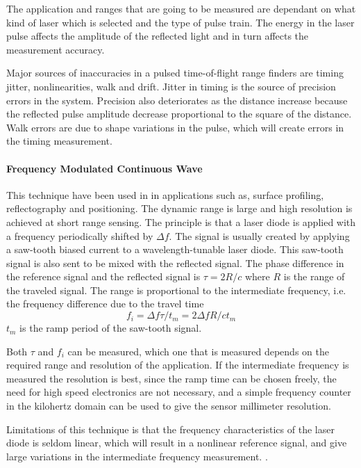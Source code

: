 The application and ranges that are going to be measured are dependant on what kind of
laser which is selected and the type of pulse train. The energy in the laser pulse affects the amplitude of the
reflected light and in turn affects the measurement accuracy.

Major sources of inaccuracies in a pulsed time-of-flight range finders are timing jitter,
nonlinearities, walk and drift. Jitter in timing is the source of precision errors in the
system. Precision also deteriorates as the distance increase because the reflected pulse
amplitude decrease proportional to the square of the distance\cite{pulsed-tof}.
Walk errors are due to shape variations in the pulse, which will create errors in the
timing measurement. 





\paragraph{Frequency Modulated Continuous Wave}
This technique have been used in in applications such as, surface profiling, 
reflectography and positioning. The dynamic range is large and
high resolution is achieved at short range sensing. The principle is that a laser diode is applied
with a frequency periodically shifted by $\Delta f$. The signal is usually created by 
applying a saw-tooth biased current to a wavelength-tunable laser diode. This saw-tooth
signal is also sent to be mixed with the reflected signal. The phase difference in the
reference signal and the reflected signal is $\tau = 2 R / c$ where $R$ is the range of
the traveled signal. The range is proportional to the intermediate frequency, i.e. the
frequency difference due to the travel time
\begin{equation}
    f_i = \Delta f \tau /t_m = 2 \Delta f R /c t_m
\end{equation}
$t_m$ is the ramp period of the saw-tooth signal. 

Both $\tau$ and $f_i$ can be measured, which one that is measured depends on the required
range and resolution of the application. If the intermediate frequency is measured the resolution is best,
since the ramp time can be chosen freely, the need for high speed electronics are not
necessary, and a simple frequency counter in the kilohertz domain can be used to give the
sensor millimeter resolution.

Limitations of this technique is that the frequency characteristics of the laser diode is
seldom linear, which will result in a nonlinear reference signal, and give large  
variations in the intermediate frequency measurement.
\cite{laser-ranging-critical-review}.


